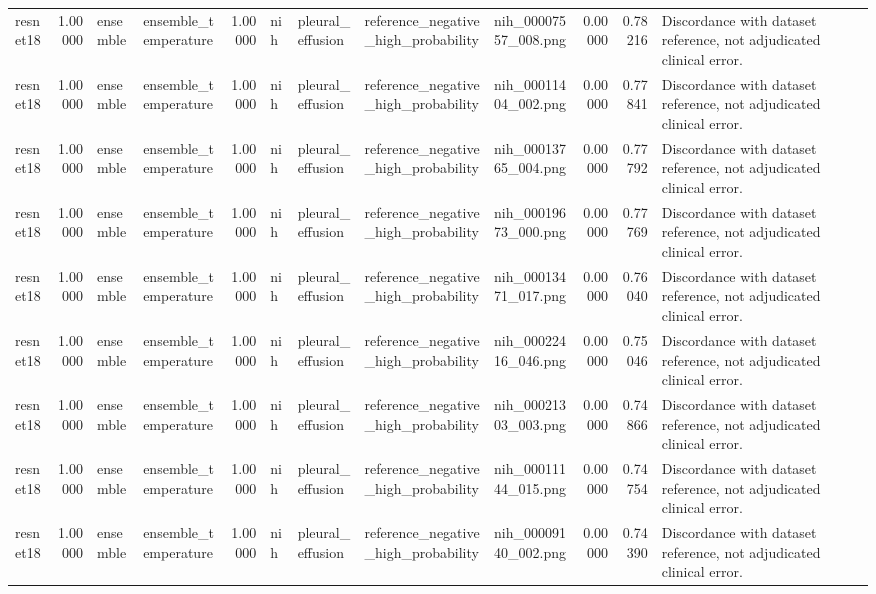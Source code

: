 \begin{tabular}{lrllrllllrrl}
resnet18 & 1.00000 & ensemble & ensemble\_temperature & 1.00000 & nih & pleural\_effusion & reference\_negative\_high\_probability & nih\_00007557\_008.png & 0.00000 & 0.78216 & Discordance with dataset reference, not adjudicated clinical error. \\
resnet18 & 1.00000 & ensemble & ensemble\_temperature & 1.00000 & nih & pleural\_effusion & reference\_negative\_high\_probability & nih\_00011404\_002.png & 0.00000 & 0.77841 & Discordance with dataset reference, not adjudicated clinical error. \\
resnet18 & 1.00000 & ensemble & ensemble\_temperature & 1.00000 & nih & pleural\_effusion & reference\_negative\_high\_probability & nih\_00013765\_004.png & 0.00000 & 0.77792 & Discordance with dataset reference, not adjudicated clinical error. \\
resnet18 & 1.00000 & ensemble & ensemble\_temperature & 1.00000 & nih & pleural\_effusion & reference\_negative\_high\_probability & nih\_00019673\_000.png & 0.00000 & 0.77769 & Discordance with dataset reference, not adjudicated clinical error. \\
resnet18 & 1.00000 & ensemble & ensemble\_temperature & 1.00000 & nih & pleural\_effusion & reference\_negative\_high\_probability & nih\_00013471\_017.png & 0.00000 & 0.76040 & Discordance with dataset reference, not adjudicated clinical error. \\
resnet18 & 1.00000 & ensemble & ensemble\_temperature & 1.00000 & nih & pleural\_effusion & reference\_negative\_high\_probability & nih\_00022416\_046.png & 0.00000 & 0.75046 & Discordance with dataset reference, not adjudicated clinical error. \\
resnet18 & 1.00000 & ensemble & ensemble\_temperature & 1.00000 & nih & pleural\_effusion & reference\_negative\_high\_probability & nih\_00021303\_003.png & 0.00000 & 0.74866 & Discordance with dataset reference, not adjudicated clinical error. \\
resnet18 & 1.00000 & ensemble & ensemble\_temperature & 1.00000 & nih & pleural\_effusion & reference\_negative\_high\_probability & nih\_00011144\_015.png & 0.00000 & 0.74754 & Discordance with dataset reference, not adjudicated clinical error. \\
resnet18 & 1.00000 & ensemble & ensemble\_temperature & 1.00000 & nih & pleural\_effusion & reference\_negative\_high\_probability & nih\_00009140\_002.png & 0.00000 & 0.74390 & Discordance with dataset reference, not adjudicated clinical error. \\

\end{tabular}
